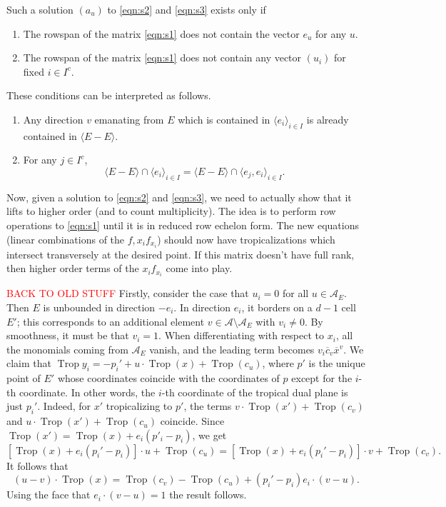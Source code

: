 \documentclass[oneside]{amsart}
\newcommand{\A}{\mathcal{A}}
\DeclareMathOperator{\trop}{Trop}
\theoremstyle{definition}
\newcommand{\nathan}[1]{\textcolor{red}{#1}}
\begin{document}
Such a solution $(a_u)$ to \eqref{eqn:s2} and \eqref{eqn:s3} exists only if
\begin{enumerate}
\item The rowspan of the matrix \eqref{eqn:s1} does not contain the vector $e_u$ for any $u$.
  \item The rowspan of the matrix \eqref{eqn:s1} does not contain any vector $(u_i)$ for fixed $i\in I^c$.
\end{enumerate}
These conditions can be interpreted as follows.
\begin{enumerate}
\item Any direction $v$ emanating from $E$ which is contained in $\langle e_i\rangle _{i\in I}$ is already contained in $\langle E-E\rangle$.
\item For any $j\in I^c$,
  \[
\langle E-E\rangle \cap \langle e_i\rangle _{i\in I}
=\langle E-E\rangle \cap \langle e_j,e_i\rangle _{i\in I}.
  \]
  \end{enumerate}

Now, given a solution to \eqref{eqn:s2} and \eqref{eqn:s3}, we need to actually show that it lifts to higher order (and to count multiplicity). The idea is to perform row operations to \eqref{eqn:s1} until it is in reduced row echelon form. The new equations (linear combinations of the $f, x_if_{x_i}$) should now have tropicalizations which intersect transversely at the desired point.
If this matrix doesn't have full rank, then higher order terms of the $x_if_{x_i}$ come into play.



\nathan{BACK TO OLD STUFF}
Firstly, consider the case that $u_i=0$ for all $u\in \A_E$. Then $E$ is unbounded in direction $-e_i$. In direction $e_i$, it borders on a $d-1$ cell $E'$; this corresponds to an additional element $v\in \A\setminus \A_E$ with $v_i\neq 0$. By smoothness, it must be that $v_i=1$. 
When differentiating with respect to $x_i$, all the monomials coming from $\A_E$ vanish, and the leading term becomes $v_i\overline{c}_v \overline{x}^v$. We claim that $\trop{y_i}=-p_i' + u\cdot\trop(x) + \trop(c_u)$, where $p'$ is the unique point of $E'$ whose coordinates coincide with the coordinates of  $p$ except for the $i$-th coordinate.  In other words, the $i$-th coordinate of the tropical dual plane is just $p_i'$.
Indeed, for $x'$ tropicalizing to $p'$, the terms $v\cdot\trop(x') + \trop(c_v)$  and $u\cdot\trop(x') + \trop(c_u)$ coincide. Since $\trop(x') = \trop(x) + e_i(p'_i-p_i)$, we get
\[
[\trop(x) + e_i(p_i'-p_i)]\cdot u + \trop(c_u) = [\trop(x) + e_i(p_i'-p_i)]\cdot v + \trop(c_v).
\]
It follows that 
\[
(u-v)\cdot \trop(x) = \trop(c_v) - \trop(c_u) + (p_i'-p_i) e_i\cdot (v-u).
\]
Using the face that $e_i\cdot (v-u) =1$ the result follows.
\end{document}
